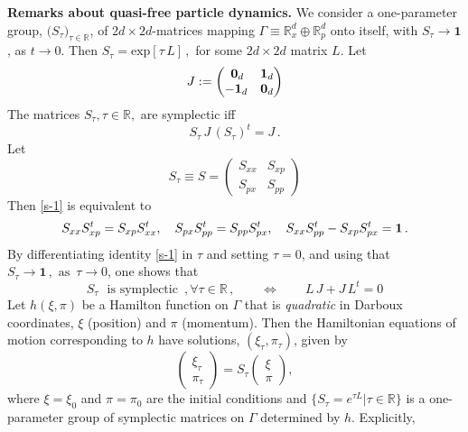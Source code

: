 \documentclass[11pt]{article}
\begin{document}
\noindent
{\bf{Remarks about quasi-free particle dynamics.}} 
We consider a one-parameter group, $\big(S_{\tau}\big)_{ \tau\in \mathbb{R}}$, of $2d\times 2d$-matrices mapping \mbox{$\Gamma \equiv \mathbb{R}^{d}_{x}\oplus \mathbb{R}^{d}_{p}$} onto itself, with $S_{\tau} \rightarrow \mathbf{1}$, as $t\rightarrow 0$. Then $S_{\tau}= \text{exp}[\tau\, L]\,,$ for some $2d\times 2d$ matrix $L$. Let
$$J:=\begin{pmatrix} {\,\bf{0}}_{d}& {\bf{1}}_{d}\\ -{\bf{1}}_{d} & {\bf{0}}_{d} \end{pmatrix}$$
The matrices $S_{\tau}, \tau \in \mathbb{R},$ are symplectic iff
\begin{equation}\label{s-1}
S_{\tau} \,J \,(S_{\tau})^{t} =J\,.
\end{equation}
Let $$S_{\tau}\equiv S = \begin{pmatrix} S_{xx}&S_{xp}\\S_{px}&S_{pp} \end{pmatrix}$$
Then \eqref{s-1} is equivalent to
\begin{equation}\label{ABCD_constr}
S_{xx} S_{xp}^t = S_{xp} S_{xx}^t, \quad S_{px} S_{pp}^t = S_{pp} S_{px}^t, \quad S_{xx} S_{pp}^t - S_{xp} S_{px}^t = {\bf{1}}\,.
\end{equation}
By differentiating identity \eqref{s-1} in $\tau$ and setting $\tau=0$, and using that $S_{\tau}\rightarrow \mathbf{1}\,, \text{ as }\, \tau \rightarrow 0$, one shows that 
\begin{equation}\label{Symplec}
S_{\tau} \,\, \text{ is symplectic }\,, \forall \tau \in \mathbb{R}\,, \qquad \Leftrightarrow \qquad L\,J + J\,L^{t}=0
\end{equation}
Let $h(\xi, \pi)$ be a Hamilton function on $\Gamma$ that is \textit{quadratic} in Darboux coordinates, $\xi$ (position)  and 
$\pi$ (momentum). Then the Hamiltonian equations of motion corresponding to $h$ have solutions, $(\xi_{\tau}, \pi_{\tau})$, given by
\begin{equation}\label{ham}
\begin{pmatrix} \xi_{\tau}\\ \pi_{\tau} \end{pmatrix}= S_{\tau} \begin{pmatrix} \xi\\ \pi \end{pmatrix},
\end{equation}
where $\xi=\xi_0$ and $\pi=\pi_0$ are the initial conditions and $\big\{S_{\tau}=e^{\tau L} \vert \tau \in \mathbb{R}\big\}$ is a one-parameter group of symplectic matrices on $\Gamma$ determined by $h$. Explicitly, 
\end{document}
